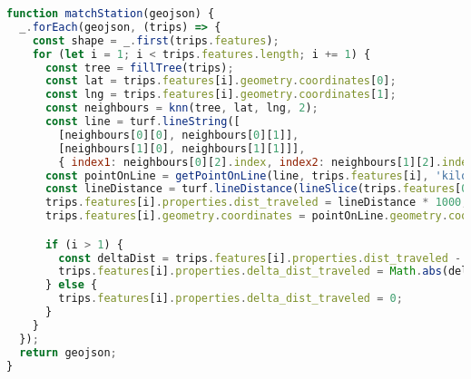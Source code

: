 \begin{newpage}
\begin{lstlisting}[captionpos=t, caption=Station Matching, label=lst:match_station, language=JavaScript]
function matchStation(geojson) {
  _.forEach(geojson, (trips) => {
    const shape = _.first(trips.features);
    for (let i = 1; i < trips.features.length; i += 1) {
      const tree = fillTree(trips);
      const lat = trips.features[i].geometry.coordinates[0];
      const lng = trips.features[i].geometry.coordinates[1];
      const neighbours = knn(tree, lat, lng, 2);
      const line = turf.lineString([
        [neighbours[0][0], neighbours[0][1]],
        [neighbours[1][0], neighbours[1][1]]],
        { index1: neighbours[0][2].index, index2: neighbours[1][2].index });
      const pointOnLine = getPointOnLine(line, trips.features[i], 'kilometers');
      const lineDistance = turf.lineDistance(lineSlice(trips.features[0].geometry.coordinates[0], pointOnLine, shape));
      trips.features[i].properties.dist_traveled = lineDistance * 1000;
      trips.features[i].geometry.coordinates = pointOnLine.geometry.coordinates;

      if (i > 1) {
        const deltaDist = trips.features[i].properties.dist_traveled - trips.features[i - 1].properties.dist_traveled;
        trips.features[i].properties.delta_dist_traveled = Math.abs(deltaDist);
      } else {
        trips.features[i].properties.delta_dist_traveled = 0;
      }
    }
  });
  return geojson;
}

\end{lstlisting}

      
\end{newpage}